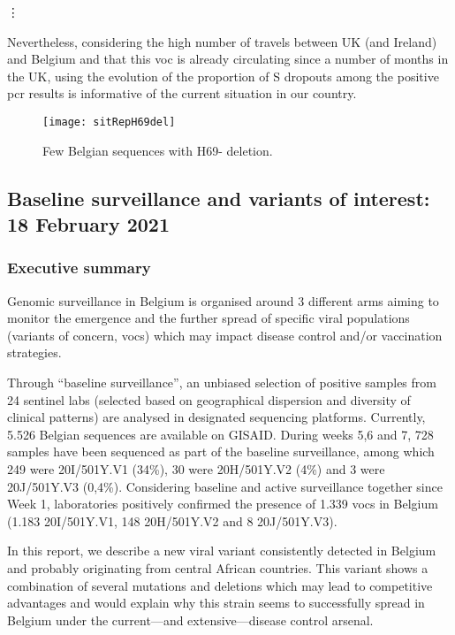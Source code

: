 \vdots

Nevertheless, considering the high number of travels between UK (and Ireland) and Belgium and that this \gls{voc} is already circulating since a number of months in the UK, using the evolution of the proportion of S dropouts among the positive \gls{pcr} results is informative of the current situation in our country.

\begin{figure}[ht]
  \centering
  \texttt{[image: sitRepH69del]}
  \caption[Few Belgian sequences with H69- deletion]{Few Belgian sequences with H69- deletion.}
  \label{fig:sitRepH69del}
\end{figure}

\subsection{Baseline surveillance and variants of interest: 18 February 2021}
\subsubsection{Executive summary}
Genomic surveillance in Belgium is organised around 3 different arms aiming to monitor the emergence and the further spread of specific viral populations (variants of concern, \gls{voc}s) which may impact disease control and/or vaccination strategies.

Through ``baseline surveillance'', an unbiased selection of positive samples from 24 sentinel labs (selected based on geographical dispersion and diversity of clinical patterns) are analysed in designated sequencing platforms.
Currently, 5.526 Belgian sequences are available on GISAID. During weeks 5,6 and 7, 728 samples have been sequenced as part of the baseline surveillance, among which 249 were 20I/501Y.V1 (34\%), 30 were 20H/501Y.V2 (4\%) and 3 were 20J/501Y.V3 (0,4\%).
Considering baseline and active surveillance together since Week 1, laboratories positively confirmed the presence of 1.339 \gls{voc}s in Belgium (1.183 20I/501Y.V1, 148 20H/501Y.V2 and 8 20J/501Y.V3).

In this report, we describe a new viral variant consistently detected in Belgium and probably originating from central African countries.
This variant shows a combination of several mutations and deletions which may lead to competitive advantages and would explain why this strain seems to successfully spread in Belgium under the current---and extensive---disease control arsenal.

